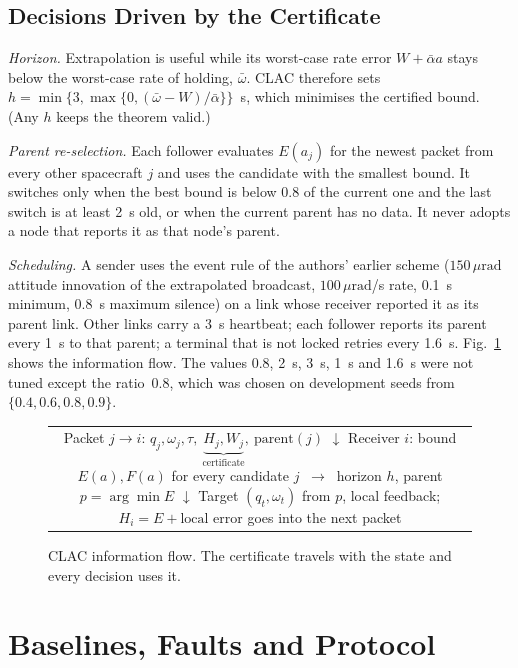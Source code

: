 \documentclass[journal]{IEEEtran}
\newcommand{\urad}{\,\mu\text{rad}}
\begin{document}
\subsection{Decisions Driven by the Certificate}
\emph{Horizon.} Extrapolation is useful while its worst-case rate error $W+\bar\alpha a$ stays below the worst-case rate of holding, $\bar\omega$. CLAC therefore sets $h=\min\{3,\max\{0,(\bar\omega-W)/\bar\alpha\}\}$~s, which minimises the certified bound. (Any $h$ keeps the theorem valid.)

\emph{Parent re-selection.} Each follower evaluates $E(a_{j})$ for the newest packet from every other spacecraft $j$ and uses the candidate with the smallest bound. It switches only when the best bound is below $0.8$ of the current one and the last switch is at least 2~s old, or when the current parent has no data. It never adopts a node that reports it as that node's parent.

\emph{Scheduling.} A sender uses the event rule of the authors' earlier scheme ($150\urad$ attitude innovation of the extrapolated broadcast, $100\urad$/s rate, 0.1~s minimum, 0.8~s maximum silence) on a link whose receiver reported it as its parent link. Other links carry a 3~s heartbeat; each follower reports its parent every 1~s to that parent; a terminal that is not locked retries every 1.6~s. Fig.~\ref{fig:arch} shows the information flow. The values $0.8$, 2~s, 3~s, 1~s and 1.6~s were not tuned except the ratio~0.8, which was chosen on development seeds from $\{0.4,0.6,0.8,0.9\}$.

\begin{figure}[!t]
\centering
\begin{tabular}{@{}c@{}}
\small
\fbox{\parbox{0.92\columnwidth}{\centering
Packet $j\!\to\! i$: $q_j,\omega_j,\tau,\ \underbrace{H_j,W_j}_{\text{certificate}},\ \text{parent}(j)$\\[2pt]
$\downarrow$\\[2pt]
Receiver $i$: bound $E(a),F(a)$ for every candidate $j$ $\ \to\ $ horizon $h$, parent $p=\arg\min E$\\[2pt]
$\downarrow$\\[2pt]
Target $(q_t,\omega_t)$ from $p$, local feedback; $H_i=E+\text{local error}$ goes into the next packet}}
\end{tabular}
\caption{CLAC information flow. The certificate travels with the state and every decision uses it.}
\label{fig:arch}
\end{figure}

\section{Baselines, Faults and Protocol}\label{sec:protocol}
\end{document}
